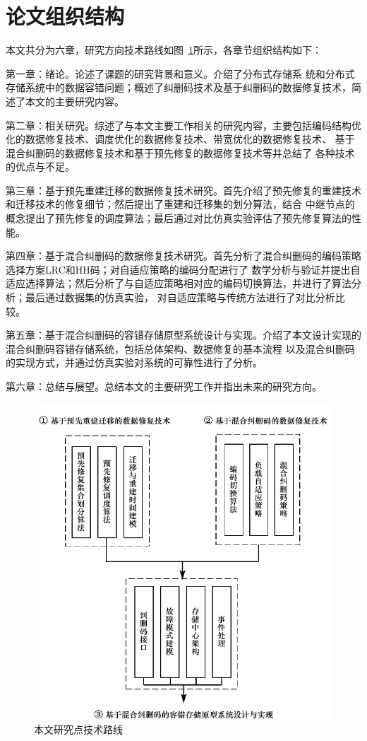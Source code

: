 \section{论文组织结构}

本文共分为六章，研究方向技术路线如图~\ref{archi}所示，各章节组织结构如下：

第一章：绪论。论述了课题的研究背景和意义。介绍了分布式存储系
统和分布式存储系统中的数据容错问题；概述了纠删码技术及基于纠删码的数据修复技术，简述了本文的主要研究内容。

第二章：相关研究。综述了与本文主要工作相关的研究内容，主要包括编码结构优化的数据修复技术、调度优化的数据修复技术、带宽优化的数据修复技术、
基于混合纠删码的数据修复技术和基于预先修复的数据修复技术等并总结了
各种技术的优点与不足。 

第三章：基于预先重建迁移的数据修复技术研究。首先介绍了预先修复的重建技术和迁移技术的修复细节；然后提出了重建和迁移集的划分算法，结合
中继节点的概念提出了预先修复的调度算法；最后通过对比仿真实验评估了预先修复算法的性能。

第四章：基于混合纠删码的数据修复技术研究。首先分析了混合纠删码的编码策略选择方案LRC和HH码；对自适应策略的编码分配进行了
数学分析与验证并提出自适应选择算法；然后分析了与自适应策略相对应的编码切换算法，并进行了算法分析；最后通过数据集的仿真实验，
对自适应策略与传统方法进行了对比分析比较。

第五章：基于混合纠删码的容错存储原型系统设计与实现。介绍了本文设计实现的混合纠删码容错存储系统，包括总体架构、数据修复的基本流程
以及混合纠删码的实现方式，并通过仿真实验对系统的可靠性进行了分析。

第六章：总结与展望。总结本文的主要研究工作并指出未来的研究方向。

\begin{figure}[H]
	\centering
	\includegraphics [scale=0.95]{figures/archi.pdf}
	\caption{本文研究点技术路线}
	\label{archi}
\end{figure}


